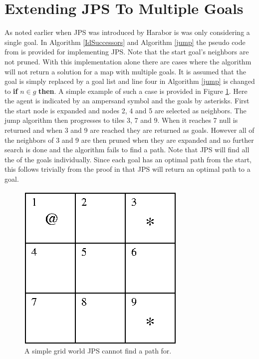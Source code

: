 \documentclass[12pt]{article}
\begin{document}
\section{Extending JPS To Multiple Goals}
As noted earlier when JPS was introduced by Harabor is was only considering a single goal. In Algorithm \ref{IdSuccessors} and Algorithm \ref{jump} 
the pseudo code from \cite{Har2011} is provided for implementing JPS. Note that the start goal's neighbors are not pruned. With this implementation 
alone there are cases where the algorithm
will not return a solution for a map with multiple goals. It is assumed that the goal is simply replaced by a goal list and line four in 
Algorithm \ref{jump} is changed to \textbf{if} $n \in g$ \textbf{then}. A simple example of such a case is provided in Figure \ref{bad_jps}. 
Here the agent is indicated by an ampersand symbol and the goals by asterisks. 
First the start node is expanded and nodes 2, 4 and 5 are selected as neighbors. The jump algorithm then
progresses to tiles 3, 7 and 9. When it reaches 7 null is returned and when 3 and 9 are reached they are returned as goals. However all of the neighbors
of 3 and 9 are then pruned when they are expanded and no further search is done and the algorithm fails to find a path. Note that JPS will find all the of
the goals individually. Since each goal has an optimal path from the start, this follows trivially from the proof in\cite{Har2011} that JPS will return
an optimal path to a goal.

\begin{figure}
\begin{center}
  \includegraphics[scale=1]{figures/JPS_multiple_goals_counter_example.eps}
  \caption{A simple grid world JPS cannot find a path for.}\label{bad_jps}
\end{center}
\end{figure}
\end{document}

